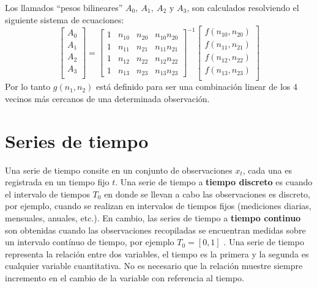 Los llamados ``pesos bilineares''\cite{26} $A_0,~A_1,~A_2\text{ y }A_3$, son calculados resolviendo el siguiente sistema de ecuaciones:
\begin{equation}\label{interp2d}
    \begin{bmatrix}
        A_0 \\
        A_1 \\
        A_2 \\
        A_3 \\
    \end{bmatrix}
    =
    \begin{bmatrix}
        1 & n_{10} & n_{20} & n_{10}n_{20} \\
        1 & n_{11} & n_{21} & n_{11}n_{21} \\
        1 & n_{12} & n_{22} & n_{12}n_{22} \\
        1 & n_{13} & n_{23} & n_{13}n_{23} 
    \end{bmatrix}^{-1}
    \begin{bmatrix}
        f(n_{10},n_{20}) \\
        f(n_{11},n_{21}) \\
        f(n_{12},n_{22}) \\
        f(n_{13},n_{23}) \\
    \end{bmatrix}
\end{equation}
Por lo tanto $g(n_1,n_2)$ está definido para ser una combinación linear de los 4 vecinos más cercanos de una determinada observación.
%
%
%
%
\section{Series de tiempo}
Una serie de tiempo consite en un conjunto de observaciones $x_t$, cada una es registrada en un tiempo fijo $t$.
Una serie de tiempo a \textbf{tiempo discreto} es cuando el intervalo de tiempos $T_0$ en donde se llevan a cabo las observaciones
es discreto, por ejemplo, cuando se realizan en intervalos de tiempos fijos (mediciones diarias, mensuales, anuales, etc.). 
En cambio, las series de tiempo a \textbf{tiempo continuo} son obtenidas cuando las observaciones recopiladas se encuentran medidas sobre un intervalo
contínuo de tiempo, por ejemplo $T_0=[0,1]$ \cite{21}. Una serie de tiempo representa la relación entre dos variables, el tiempo es la primera 
y la segunda es cualquier variable cuantitativa. No es necesario que la relación muestre siempre incremento en el cambio de la variable con referencia al tiempo. 

